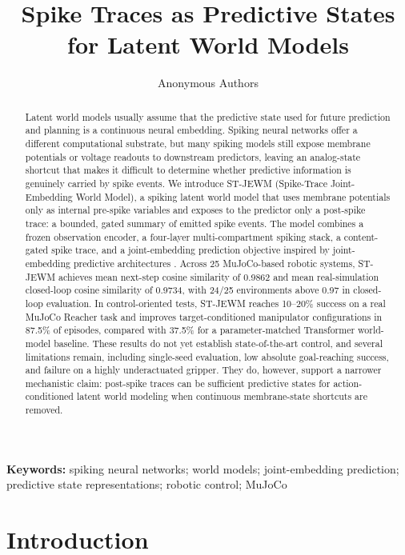 \documentclass[10pt]{article}
\title{Spike Traces as Predictive States for Latent World Models}
\author[1]{Anonymous Authors}
\affil[1]{Anonymous Institution}
\date{}
\newcommand{\method}{ST-JEWM}
\begin{document}
\maketitle

\begin{abstract}
Latent world models usually assume that the predictive state used for future prediction and planning is a continuous neural embedding. Spiking neural networks offer a different computational substrate, but many spiking models still expose membrane potentials or voltage readouts to downstream predictors, leaving an analog-state shortcut that makes it difficult to determine whether predictive information is genuinely carried by spike events. We introduce \method{} (Spike-Trace Joint-Embedding World Model), a spiking latent world model that uses membrane potentials only as internal pre-spike variables and exposes to the predictor only a post-spike trace: a bounded, gated summary of emitted spike events. The model combines a frozen observation encoder, a four-layer multi-compartment spiking stack, a content-gated spike trace, and a joint-embedding prediction objective inspired by joint-embedding predictive architectures \citep{jepa}. Across 25 MuJoCo-based robotic systems, \method{} achieves mean next-step cosine similarity of 0.9862 and mean real-simulation closed-loop cosine similarity of 0.9734, with 24/25 environments above 0.97 in closed-loop evaluation. In control-oriented tests, \method{} reaches 10--20\% success on a real MuJoCo Reacher task and improves target-conditioned manipulator configurations in 87.5\% of episodes, compared with 37.5\% for a parameter-matched Transformer world-model baseline. These results do not yet establish state-of-the-art control, and several limitations remain, including single-seed evaluation, low absolute goal-reaching success, and failure on a highly underactuated gripper. They do, however, support a narrower mechanistic claim: post-spike traces can be sufficient predictive states for action-conditioned latent world modeling when continuous membrane-state shortcuts are removed.
\end{abstract}

\noindent\textbf{Keywords:} spiking neural networks; world models; joint-embedding prediction; predictive state representations; robotic control; MuJoCo

\section{Introduction}
\end{document}
